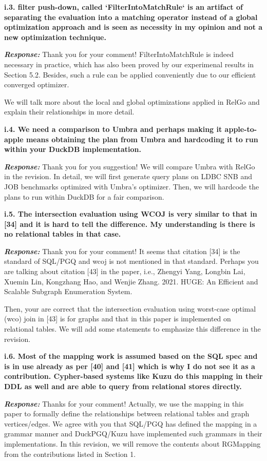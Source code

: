 \textbf{i.3. filter push-down, called `FilterIntoMatchRule` is an artifact of separating the evaluation into a matching operator instead of a global optimization approach and is seen as necessity in my opinion and not a new optimization technique.}

\textbf{\textit{Response: }}
Thank you for your comment! FilterIntoMatchRule is indeed necessary in practice, which has also been proved by our experimenal results in Section 5.2.
Besides, such a rule can be applied conveniently due to our efficient converged optimizer.

We will talk more about the local and global optimizations applied in RelGo and explain their relationships in more detail.

\textbf{
i.4. We need a comparison to Umbra and perhaps making it apple-to-apple means obtaining the plan from Umbra and hardcoding it to run within your DuckDB implementation.
}

\textbf{\textit{Response: }}
Thank you for you suggestion! We will compare Umbra with RelGo in the revision. In detail, we will first generate query plans on LDBC SNB and JOB benchmarks optimized with Umbra's optimizer. Then, we will hardcode the plans to run within DuckDB for a fair comparison.


\textbf{
i.5. The intersection evaluation using WCOJ is very similar to that in [34] and it is hard to tell the difference. My understanding is there is no relational tables in that case.}

\textbf{\textit{Response: }}
Thank you for your comment! It seems that citation [34] is the standard of SQL/PGQ and wcoj is not mentioned in that standard.
Perhaps you are talking about citation [43] in the paper, i.e., Zhengyi Yang, Longbin Lai, Xuemin Lin, Kongzhang Hao, and Wenjie Zhang.
2021. HUGE: An Efficient and Scalable Subgraph Enumeration System.

Then, your are correct that the intersection evaluation using worst-case optimal (wco) join in [43] is for graphs and that in this paper is implemented on relational tables.
We will add some statements to emphasize this difference in the revision.


\textbf{
i.6. Most of the mapping work is assumed based on the SQL spec and is in use already as per [40] and [41] which is why I do not see it as a contribution. Cypher-based systems like Kuzu do this mapping in their DDL as well and are able to query from relational stores directly.}

\textbf{\textit{Response: }}
Thanks for your comment! Actually, we use the mapping in this paper to formally define the relationships between relational tables and graph vertices/edges. We agree with you that SQL/PGQ has defined the mapping in a grammar manner and DuckPGQ/Kuzu have implemented such grammars in their implementations. In this revision, we will remove the contents about RGMapping from the contributions listed in Section 1.

